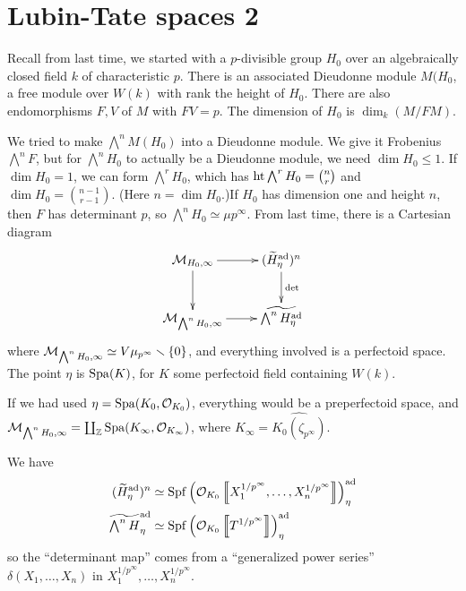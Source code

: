 
\section{Lubin-Tate spaces 2}





Recall from last time, we started with a $p$-divisible group $H_0$ over an 
algebraically closed field $k$ of characteristic $p$. There is an associated 
Dieudonne module $M(H_0$, a free module over $W(k)$ with rank the height of 
$H_0$. There are also endomorphisms $F,V$ of $M$ with $F V=p$. The dimension of 
$H_0$ is $\dim_k(M/F M)$. 

We tried to make $\bigwedge^n M(H_0)$ into a Dieudonne module. We give it 
Frobenius $\bigwedge^n F$, but for $\bigwedge^n H_0$ to actually be a 
Dieudonne module, we need $\dim H_0\leqslant 1$. If $\dim H_0=1$, we can form 
$\bigwedge^r H_0$, which has $\operatorname{ht} \bigwedge^r H_0=\binom n r$ and 
$\dim H_0 = \binom{n-1}{r-1}$. (Here $n=\dim H_0$.)If $H_0$ has dimension one 
and height $n$, then $F$ has determinant $p$, so 
$\bigwedge^n H_0\simeq \mu{p^\infty}$. From last time, there is a Cartesian 
diagram 
\[\xymatrix{
  \cM_{H_0,\infty} \ar[r] \ar[d] 
    & (\widetilde H_\eta^\ad)^n \ar[d]^-\det \\
  \cM_{\bigwedge^n H_0,\infty} \ar[r] 
    & \widetilde{\bigwedge^n H_\eta^\ad}
}\]
where $\mathcal{M}_{\bigwedge^n H_0,\infty} \simeq V \mu_{p^\infty}\smallsetminus \{0\}$, 
and everything involved is a perfectoid space. The point $\eta$ is 
$\operatorname{Spa}(K)$, for $K$ some perfectoid field containing $W(k)$. 

If we had used $\eta=\operatorname{Spa}(K_0,\mathcal{O}_{K_0})$, everything would be a preperfectoid 
space, and $\mathcal{M}_{\bigwedge^n H_0,\infty} =\coprod_{\mathbb{Z}} \operatorname{Spa}(K_\infty,\mathcal{O}_{K_\infty})$, 
where $K_\infty=\widehat{K_0(\zeta_{p^\infty})}$. 

We have 
\begin{align*}
  (\widetilde H_\eta^{\textnormal{ad}})^n 
    &\simeq \operatorname{Spf}\left(\mathcal{O}_{K_0}\left\llbracket {X_1^{1/p^\infty},\dots,X_n^{1/p^\infty}} \right\rrbracket\right)_\eta^{\textnormal{ad}} \\
  \widetilde{\textstyle\bigwedge^n H}_\eta^{\textnormal{ad}}
    &\simeq \operatorname{Spf}\left(\mathcal{O}_{K_0}\left\llbracket {T^{1/p^\infty}} \right\rrbracket\right)_\eta^{\textnormal{ad}} 
\end{align*}
so the ``determinant map'' comes from a ``generalized power series'' 
$\delta(X_1,\dots,X_n)$ in $X_1^{1/p^\infty},\dots,X_n^{1/p^\infty}$. 

